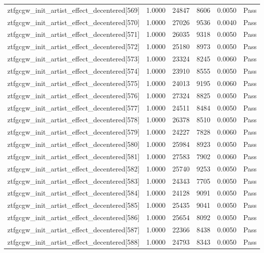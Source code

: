 \begin{table}[htbp]
\begin{tabular}{llrrll}
ztfgcgw\_init\_artist\_effect\_decentered[569] & 1.0000 & 24847 & 8606 & 0.0050 & Pass \\
ztfgcgw\_init\_artist\_effect\_decentered[570] & 1.0000 & 27026 & 9536 & 0.0040 & Pass \\
ztfgcgw\_init\_artist\_effect\_decentered[571] & 1.0000 & 26035 & 9318 & 0.0050 & Pass \\
ztfgcgw\_init\_artist\_effect\_decentered[572] & 1.0000 & 25180 & 8973 & 0.0050 & Pass \\
ztfgcgw\_init\_artist\_effect\_decentered[573] & 1.0000 & 23324 & 8245 & 0.0060 & Pass \\
ztfgcgw\_init\_artist\_effect\_decentered[574] & 1.0000 & 23910 & 8555 & 0.0050 & Pass \\
ztfgcgw\_init\_artist\_effect\_decentered[575] & 1.0000 & 24013 & 9195 & 0.0060 & Pass \\
ztfgcgw\_init\_artist\_effect\_decentered[576] & 1.0000 & 27324 & 8825 & 0.0050 & Pass \\
ztfgcgw\_init\_artist\_effect\_decentered[577] & 1.0000 & 24511 & 8484 & 0.0050 & Pass \\
ztfgcgw\_init\_artist\_effect\_decentered[578] & 1.0000 & 26378 & 8510 & 0.0050 & Pass \\
ztfgcgw\_init\_artist\_effect\_decentered[579] & 1.0000 & 24227 & 7828 & 0.0060 & Pass \\
ztfgcgw\_init\_artist\_effect\_decentered[580] & 1.0000 & 25984 & 8923 & 0.0050 & Pass \\
ztfgcgw\_init\_artist\_effect\_decentered[581] & 1.0000 & 27583 & 7902 & 0.0060 & Pass \\
ztfgcgw\_init\_artist\_effect\_decentered[582] & 1.0000 & 25740 & 9253 & 0.0050 & Pass \\
ztfgcgw\_init\_artist\_effect\_decentered[583] & 1.0000 & 24343 & 7705 & 0.0050 & Pass \\
ztfgcgw\_init\_artist\_effect\_decentered[584] & 1.0000 & 24128 & 9091 & 0.0050 & Pass \\
ztfgcgw\_init\_artist\_effect\_decentered[585] & 1.0000 & 25435 & 9041 & 0.0050 & Pass \\
ztfgcgw\_init\_artist\_effect\_decentered[586] & 1.0000 & 25654 & 8092 & 0.0050 & Pass \\
ztfgcgw\_init\_artist\_effect\_decentered[587] & 1.0000 & 22366 & 8438 & 0.0050 & Pass \\
ztfgcgw\_init\_artist\_effect\_decentered[588] & 1.0000 & 24793 & 8343 & 0.0050 & Pass \\

\end{tabular}
\end{table}
